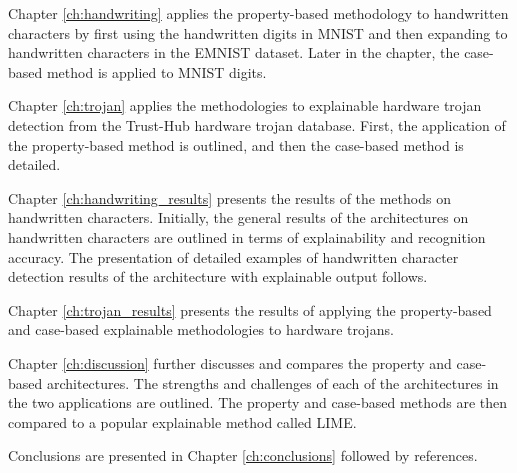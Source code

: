Chapter \ref{ch:handwriting} applies the property-based methodology to
handwritten characters by first using the handwritten digits in MNIST and then
expanding to handwritten characters in the EMNIST dataset. Later in the chapter,
the case-based method is applied to MNIST digits.

Chapter \ref{ch:trojan} applies the methodologies to explainable hardware trojan
detection from the Trust-Hub hardware trojan database. First, the application of
the property-based method is outlined, and then the case-based method is
detailed.

Chapter \ref{ch:handwriting_results} presents the results of the methods on
handwritten characters. Initially, the general results of the architectures on
handwritten characters are outlined in terms of explainability and recognition
accuracy. The presentation of detailed examples of handwritten character
detection results of the architecture with explainable output follows.

Chapter \ref{ch:trojan_results} presents the results of applying the
property-based and case-based explainable methodologies to hardware trojans.

Chapter \ref{ch:discussion} further discusses and compares the property and
case-based architectures. The strengths and challenges of each of the
architectures in the two applications are outlined. The property and case-based
methods are then compared to a popular explainable method called LIME.

Conclusions are presented in Chapter \ref{ch:conclusions} followed by
references.